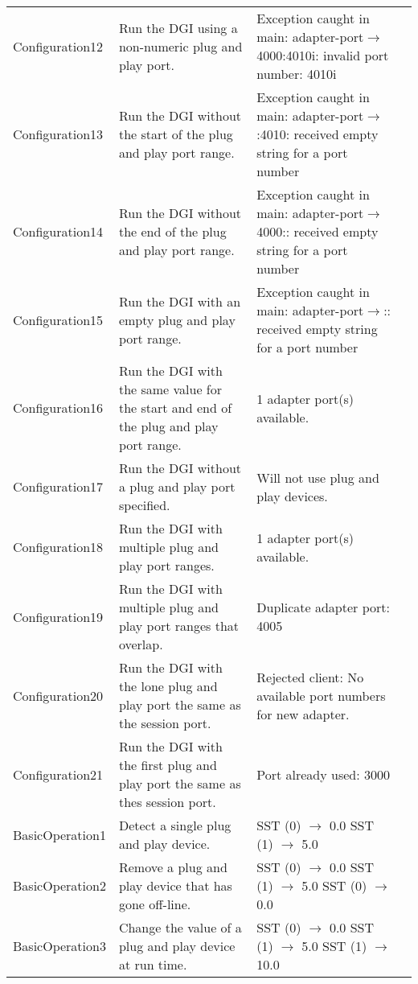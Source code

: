 \documentclass{article}
\begin{document}
\begin{center}
\begin{footnotesize}
\begin{longtable}{|p{3cm}|p{4cm}|p{10cm}|c|}
    Configuration12 & Run the DGI using a non-numeric plug and play port. & Exception caught in main: adapter-port$\rightarrow$4000:4010i: invalid port number: 4010i & \\
    Configuration13 & Run the DGI without the start of the plug and play port range. & Exception caught in main: adapter-port$\rightarrow$:4010: received empty string for a port number & \\
    Configuration14 & Run the DGI without the end of the plug and play port range. & Exception caught in main: adapter-port$\rightarrow$4000:: received empty string for a port number & \\
    Configuration15 & Run the DGI with an empty plug and play port range. & Exception caught in main: adapter-port$\rightarrow$:: received empty string for a port number & \\
    Configuration16 & Run the DGI with the same value for the start and end of the plug and play port range. & 1 adapter port(s) available. & \\
    Configuration17 & Run the DGI without a plug and play port specified. & Will not use plug and play devices. & \\
    Configuration18 & Run the DGI with multiple plug and play port ranges. & 1 adapter port(s) available. & \\
    Configuration19 & Run the DGI with multiple plug and play port ranges that overlap. & Duplicate adapter port: 4005 & \\
    Configuration20 & Run the DGI with the lone plug and play port the same as the session port. & Rejected client: No available port numbers for new adapter. & \\
    Configuration21 & Run the DGI with the first plug and play port the same as thes session port. & Port already used: 3000 & \\
    BasicOperation1 & Detect a single plug and play device. & SST (0) $\rightarrow$ 0.0 \newline SST (1) $\rightarrow$ 5.0 & \\
    BasicOperation2 & Remove a plug and play device that has gone off-line. & SST (0) $\rightarrow$ 0.0 \newline SST (1) $\rightarrow$ 5.0 \newline SST (0) $\rightarrow$ 0.0 & \\
    BasicOperation3 & Change the value of a plug and play device at run time. & SST (0) $\rightarrow$ 0.0 \newline SST (1) $\rightarrow$ 5.0 \newline SST (1) $\rightarrow$ 10.0 & \\

\end{longtable}
\end{footnotesize}
\end{center}
\end{document}
